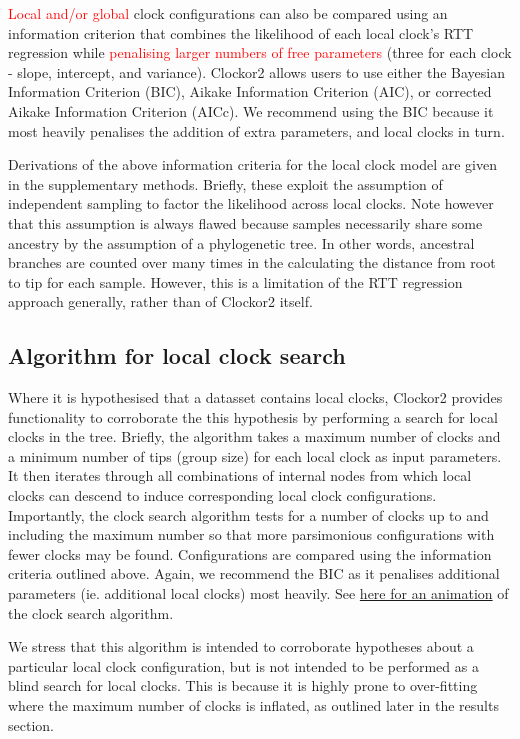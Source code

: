 \documentclass{article}
\begin{document}
\textcolor{red}{Local and/or global} clock configurations can also be compared using an information criterion that combines the likelihood of each local clock's RTT regression while \textcolor{red}{penalising larger numbers of free parameters} (three for each clock - slope, intercept, and variance). Clockor2 allows users to use either the Bayesian Information Criterion (BIC), Aikake Information Criterion (AIC), or corrected Aikake Information Criterion (AICc). We recommend using the BIC because it most heavily penalises the addition of extra parameters, and local clocks in turn.

Derivations of the above information criteria for the local clock model are given in the supplementary methods. Briefly, these exploit the assumption of independent sampling to factor the likelihood across local clocks. Note however that this assumption is always flawed because samples necessarily share some ancestry by the assumption of a phylogenetic tree. In other words, ancestral branches are counted over many times in the calculating the distance from root to tip for each sample. However, this is a limitation of the RTT regression approach generally, rather than of Clockor2 itself.

\subsection*{Algorithm for local clock search}
Where it is hypothesised that a datasset contains local clocks, Clockor2 provides functionality to corroborate the this hypothesis by performing a search for local clocks in the tree. Briefly, the algorithm takes a maximum number of clocks and a minimum number of tips (group size) for each local clock as input parameters. It then iterates through all combinations of internal nodes from which local clocks can descend to induce corresponding local clock configurations. Importantly, the clock search algorithm tests for a number of clocks up to and including the maximum number so that more parsimonious configurations with fewer clocks may be found. Configurations are compared using the information criteria outlined above. Again, we recommend the BIC as it penalises additional parameters (ie. additional local clocks) most heavily. See \href{https://github.com/LeoFeatherstone/clockor2Paper/blob/main/figures/clockSearchEg2Clocks.gif}{here for an animation} of the clock search algorithm. 

We stress that this algorithm is intended to corroborate hypotheses about a particular local clock configuration, but is not intended to be performed as a blind search for local clocks. This is because it is highly prone to over-fitting where the maximum number of clocks is inflated, as outlined later in the results section.
\end{document}
